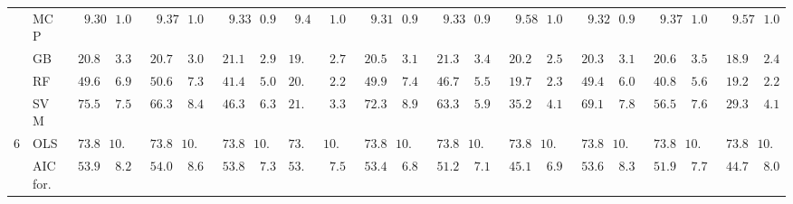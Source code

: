 \begin{tabular}{llllllllllllllllllllll}
	& MCP  & $\phantom{00}9.304$ & $\phantom{0}1.054$ & $\phantom{00}9.371$ & $\phantom{0}1.063$ & $\phantom{00}9.337$ & $\phantom{0}0.967$ & $\phantom{0}9.485$ & $\phantom{0}1.054$ & $\phantom{00}9.318$ & $\phantom{0}0.990$ & $\phantom{00}9.338$ & $\phantom{0}0.978$ & $\phantom{00}9.585$ & $\phantom{0}1.075$ & $\phantom{00}9.329$ & $\phantom{0}0.968$ & $\phantom{00}9.371$ & $\phantom{0}1.053$ & $\phantom{00}9.578$ & $\phantom{0}1.063$ \\
	& GB  & $\phantom{0}20.801$ & $\phantom{0}3.312$ & $\phantom{0}20.737$ & $\phantom{0}3.015$ & $\phantom{0}21.158$ & $\phantom{0}2.919$ & $19.368$ & $\phantom{0}2.710$ & $\phantom{0}20.513$ & $\phantom{0}3.143$ & $\phantom{0}21.308$ & $\phantom{0}3.480$ & $\phantom{0}20.210$ & $\phantom{0}2.523$ & $\phantom{0}20.398$ & $\phantom{0}3.141$ & $\phantom{0}20.676$ & $\phantom{0}3.569$ & $\phantom{0}18.922$ & $\phantom{0}2.414$ \\
	& RF  & $\phantom{0}49.694$ & $\phantom{0}6.969$ & $\phantom{0}50.651$ & $\phantom{0}7.377$ & $\phantom{0}41.490$ & $\phantom{0}5.033$ & $20.244$ & $\phantom{0}2.285$ & $\phantom{0}49.983$ & $\phantom{0}7.407$ & $\phantom{0}46.777$ & $\phantom{0}5.549$ & $\phantom{0}19.730$ & $\phantom{0}2.329$ & $\phantom{0}49.490$ & $\phantom{0}6.023$ & $\phantom{0}40.875$ & $\phantom{0}5.627$ & $\phantom{0}19.282$ & $\phantom{0}2.233$ \\
	& SVM  & $\phantom{0}75.547$ & $\phantom{0}7.590$ & $\phantom{0}66.310$ & $\phantom{0}8.490$ & $\phantom{0}46.300$ & $\phantom{0}6.331$ & $21.275$ & $\phantom{0}3.326$ & $\phantom{0}72.348$ & $\phantom{0}8.985$ & $\phantom{0}63.384$ & $\phantom{0}5.959$ & $\phantom{0}35.255$ & $\phantom{0}4.122$ & $\phantom{0}69.126$ & $\phantom{0}7.868$ & $\phantom{0}56.554$ & $\phantom{0}7.646$ & $\phantom{0}29.394$ & $\phantom{0}4.184$ \\
	6 & OLS  & $\phantom{0}73.851$ & $10.200$ & $\phantom{0}73.851$ & $10.200$ & $\phantom{0}73.851$ & $10.200$ & $73.851$ & $10.200$ & $\phantom{0}73.851$ & $10.200$ & $\phantom{0}73.851$ & $10.200$ & $\phantom{0}73.851$ & $10.200$ & $\phantom{0}73.851$ & $10.200$ & $\phantom{0}73.851$ & $10.200$ & $\phantom{0}73.851$ & $10.200$ \\
	& AIC for.  & $\phantom{0}53.931$ & $\phantom{0}8.259$ & $\phantom{0}54.014$ & $\phantom{0}8.632$ & $\phantom{0}53.871$ & $\phantom{0}7.396$ & $53.364$ & $\phantom{0}7.570$ & $\phantom{0}53.468$ & $\phantom{0}6.888$ & $\phantom{0}51.224$ & $\phantom{0}7.154$ & $\phantom{0}45.193$ & $\phantom{0}6.946$ & $\phantom{0}53.659$ & $\phantom{0}8.318$ & $\phantom{0}51.930$ & $\phantom{0}7.798$ & $\phantom{0}44.778$ & $\phantom{0}8.094$ \\

\end{tabular}
